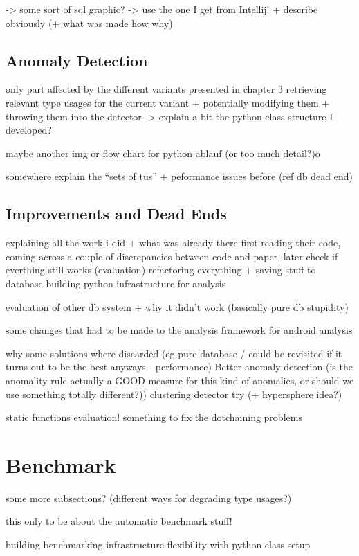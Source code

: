-> some sort of sql graphic? -> use the one I get from Intellij!
+ describe obviously (+ what was made how why)

\subsection{Anomaly Detection}\label{sec:anomaly}
only part affected by the different variants presented in chapter 3
retrieving relevant type usages for the current variant + potentially modifying them + throwing them into the detector
-> explain a bit the python class structure I developed?

maybe another img or flow chart for python ablauf (or too much detail?)o

somewhere explain the ``sets of tus'' + peformance issues before (ref db dead end)


\subsection{Improvements and Dead Ends}\label{sec:deadends}

explaining all the work i did + what was already there
    first reading their code, coming across a couple of discrepancies between code and paper, later check if everthing still works (evaluation)
    refactoring everything + saving stuff to database
    building python infrastructure for analysis

evaluation of other db system + why it didn't work (basically pure db stupidity)

some changes that had to be made to the analysis framework for android analysis

why some solutions where discarded (eg pure database / could be revisited if it turns out to be the best anyways - performance)
Better anomaly detection (is the anomality rule actually a GOOD measure for this kind of anomalies, or should we use something totally different?))
    clustering detector try (+ hypersphere idea?)

static functions evaluation!
something to fix the dotchaining problems

\section{Benchmark}
some more subsections? (different ways for degrading type usages?)

this only to be about the automatic benchmark stuff!

building benchmarking infrastructure
flexibility with python class setup
